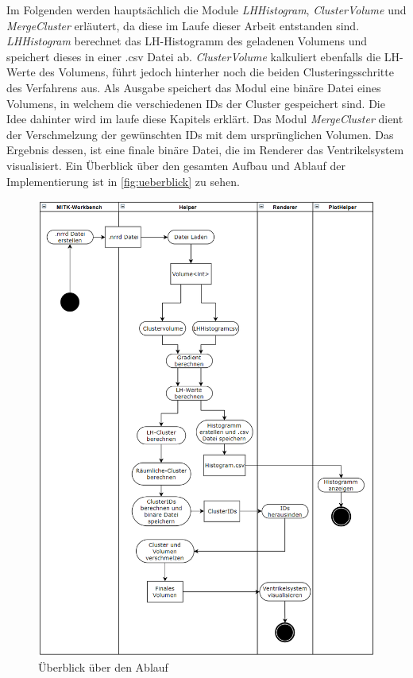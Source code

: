 Im Folgenden werden hauptsächlich die Module \textit{LHHistogram}, \textit{ClusterVolume} und \textit{MergeCluster} erläutert, da diese im Laufe dieser Arbeit entstanden sind. \textit{LHHistogram} berechnet das LH-Histogramm des geladenen Volumens und speichert dieses in einer .csv Datei ab. \textit{ClusterVolume} kalkuliert ebenfalls die LH-Werte des Volumens, führt jedoch hinterher noch die beiden Clusteringsschritte des Verfahrens aus. Als Ausgabe speichert das Modul eine binäre Datei eines Volumens, in welchem die verschiedenen IDs der Cluster gespeichert sind. Die Idee dahinter wird im laufe diese Kapitels erklärt. Das Modul \textit{MergeCluster} dient der Verschmelzung der gewünschten IDs mit dem ursprünglichen Volumen. Das Ergebnis dessen, ist eine finale binäre Datei, die im Renderer das Ventrikelsystem visualisiert. Ein Überblick über den gesamten Aufbau und Ablauf der Implementierung ist in  \autoref{fig:ueberblick} zu sehen.

\begin{figure}
\centering 
\includegraphics[width=\textwidth]{Logos/Ueberblick2.png}
\caption{Überblick über den Ablauf} 
\label{fig:ueberblick} 
\end{figure}


